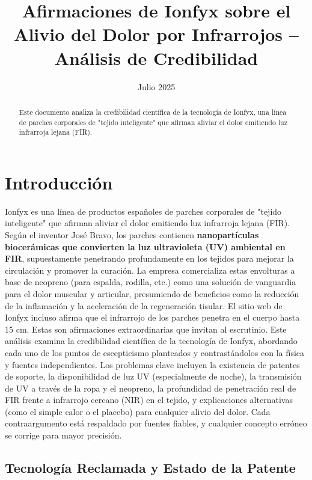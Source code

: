 \documentclass{article}
\title{Afirmaciones de Ionfyx sobre el Alivio del Dolor por Infrarrojos – Análisis de Credibilidad}
\author{}
\date{Julio 2025}
\begin{document}
\maketitle

\begin{abstract}
Este documento analiza la credibilidad científica de la tecnología de Ionfyx, una línea de parches corporales de "tejido inteligente" que afirman aliviar el dolor emitiendo luz infrarroja lejana (FIR).
\end{abstract}

\section{Introducción}

Ionfyx es una línea de productos españoles de parches corporales de "tejido inteligente" que afirman aliviar el dolor emitiendo luz infrarroja lejana (FIR). Según el inventor José Bravo, los parches contienen \textbf{nanopartículas biocerámicas que convierten la luz ultravioleta (UV) ambiental en FIR}, supuestamente penetrando profundamente en los tejidos para mejorar la circulación y promover la curación. La empresa comercializa estas envolturas a base de neopreno (para espalda, rodilla, etc.) como una solución de vanguardia para el dolor muscular y articular, presumiendo de beneficios como la reducción de la inflamación y la aceleración de la regeneración tisular. El sitio web de Ionfyx incluso afirma que el infrarrojo de los parches penetra en el cuerpo hasta 15 cm. Estas son afirmaciones extraordinarias que invitan al escrutinio. Este análisis examina la credibilidad científica de la tecnología de Ionfyx, abordando cada uno de los puntos de escepticismo planteados y contrastándolos con la física y fuentes independientes. Los problemas clave incluyen la existencia de patentes de soporte, la disponibilidad de luz UV (especialmente de noche), la transmisión de UV a través de la ropa y el neopreno, la profundidad de penetración real de FIR frente a infrarrojo cercano (NIR) en el tejido, y explicaciones alternativas (como el simple calor o el placebo) para cualquier alivio del dolor. Cada contraargumento está respaldado por fuentes fiables, y cualquier concepto erróneo se corrige para mayor precisión.

\subsection{Tecnología Reclamada y Estado de la Patente}
\end{document}
